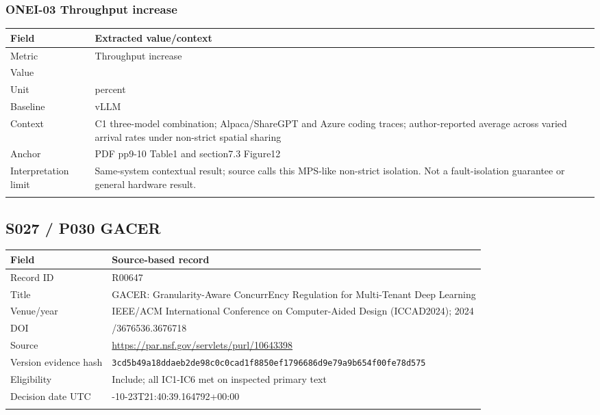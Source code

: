 \subsubsection*{ONEI-03 Throughput increase}
\begin{longtable}{>{\raggedright\arraybackslash}p{}>{\raggedright\arraybackslash}p{}}
\toprule
\textbf{Field} & \textbf{Extracted value/context}\\\midrule\endhead
Metric & Throughput increase\\\addlinespace
Value & 6.6\\\addlinespace
Unit & percent\\\addlinespace
Baseline & vLLM\\\addlinespace
Context & C1 three-model combination;\allowbreak{} Alpaca/ShareGPT and Azure coding traces;\allowbreak{} author-reported average across varied arrival rates under non-strict spatial sharing\\\addlinespace
Anchor & PDF pp9-10 Table1 and section7.3 Figure12\\\addlinespace
Interpretation limit & Same-system contextual result;\allowbreak{} source calls this MPS-like non-strict isolation. Not a fault-isolation guarantee or general hardware result.\\\addlinespace
\bottomrule\end{longtable}
\clearpage\subsection{S027 / P030 GACER}
\cite{s027}
\begin{longtable}{>{\raggedright\arraybackslash}p{}>{\raggedright\arraybackslash}p{}}
\toprule
\textbf{Field} & \textbf{Source-based record}\\\midrule\endhead
Record ID & R00647\\\addlinespace
Title & GACER: Granularity-Aware ConcurrEncy Regulation for Multi-Tenant Deep Learning\\\addlinespace
Venue/year & IEEE/ACM International Conference on Computer-Aided Design (ICCAD2024);\allowbreak{} 2024\\\addlinespace
DOI & 10.1145/3676536.3676718\\\addlinespace
Source & \url{https://par.nsf.gov/servlets/purl/10643398}\\\addlinespace
Version evidence hash & \nolinkurl{3cd5b49a18ddaeb2de98c0c0cad1f8850ef1796686d9e79a9b654f00fe78d575}\\\addlinespace
Eligibility & Include;\allowbreak{} all IC1-IC6 met on inspected primary text\\\addlinespace
Decision date UTC & 2026-10-23T21:40:39.164792+00:00\\\addlinespace
\bottomrule\end{longtable}
